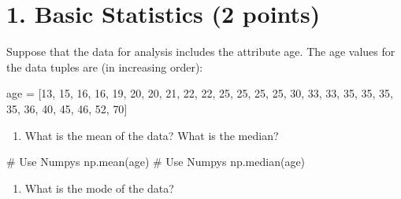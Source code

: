 \documentclass[
  letterpaper,
]{scrbook}
\newenvironment{Shaded}{\begin{snugshade}}{\end{snugshade}}
\newcommand{\CommentTok}[1]{\textcolor[rgb]{0.37,0.37,0.37}{#1}}
\newcommand{\DecValTok}[1]{\textcolor[rgb]{0.68,0.00,0.00}{#1}}
\newcommand{\NormalTok}[1]{\textcolor[rgb]{0.00,0.23,0.31}{#1}}
\newcommand{\OperatorTok}[1]{\textcolor[rgb]{0.37,0.37,0.37}{#1}}
\providecommand{\tightlist}{%
  \setlength{\itemsep}{0pt}\setlength{\parskip}{0pt}}
\begin{document}
\section*{1. Basic Statistics (2
points)}\label{basic-statistics-2-points}


Suppose that the data for analysis includes the attribute age. The age
values for the data tuples are (in increasing order):

\begin{Shaded}
\begin{Highlighting}[]
\NormalTok{age }\OperatorTok{=}\NormalTok{ [}\DecValTok{13}\NormalTok{, }\DecValTok{15}\NormalTok{, }\DecValTok{16}\NormalTok{, }\DecValTok{16}\NormalTok{, }\DecValTok{19}\NormalTok{, }\DecValTok{20}\NormalTok{, }\DecValTok{20}\NormalTok{, }\DecValTok{21}\NormalTok{, }\DecValTok{22}\NormalTok{, }\DecValTok{22}\NormalTok{, }\DecValTok{25}\NormalTok{, }\DecValTok{25}\NormalTok{, }\DecValTok{25}\NormalTok{, }\DecValTok{25}\NormalTok{, }\DecValTok{30}\NormalTok{, }\DecValTok{33}\NormalTok{, }\DecValTok{33}\NormalTok{, }\DecValTok{35}\NormalTok{, }\DecValTok{35}\NormalTok{, }\DecValTok{35}\NormalTok{, }\DecValTok{35}\NormalTok{, }\DecValTok{36}\NormalTok{, }\DecValTok{40}\NormalTok{, }\DecValTok{45}\NormalTok{, }\DecValTok{46}\NormalTok{, }\DecValTok{52}\NormalTok{, }\DecValTok{70}\NormalTok{]}
\end{Highlighting}
\end{Shaded}

\begin{enumerate}
\def\labelenumi{(\alph{enumi})}
\tightlist
\item
  What is the mean of the data? What is the median?
\end{enumerate}

\begin{Shaded}
\begin{Highlighting}[]
\CommentTok{\# Use Numpy\textquotesingle{}s np.mean(age)}
\CommentTok{\# Use Numpy\textquotesingle{}s np.median(age)}
\end{Highlighting}
\end{Shaded}

\begin{enumerate}
\def\labelenumi{(\alph{enumi})}
\setcounter{enumi}{1}
\tightlist
\item
  What is the mode of the data?
\end{enumerate}
\end{document}
